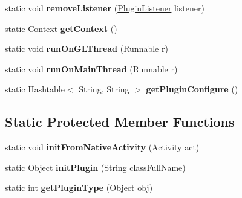 \begin{DoxyCompactItemize}
static void {\bfseries remove\+Listener} (\hyperlink{interfaceorg_1_1cocos2dx_1_1plugin_1_1PluginListener}{Plugin\+Listener} listener)
\item 
\mbox{\label{classorg_1_1cocos2dx_1_1plugin_1_1PluginWrapper_a78ef9321623e2262bfcdfec6293d1c01}} 
static Context {\bfseries get\+Context} ()
\item 
\mbox{\label{classorg_1_1cocos2dx_1_1plugin_1_1PluginWrapper_a8dac3d2958a16f7e74da27d0b2ef6ffe}} 
static void {\bfseries run\+On\+G\+L\+Thread} (Runnable r)
\item 
\mbox{\label{classorg_1_1cocos2dx_1_1plugin_1_1PluginWrapper_a62c74f83ce0165e66868e2ce2e6e91ea}} 
static void {\bfseries run\+On\+Main\+Thread} (Runnable r)
\item 
\mbox{\label{classorg_1_1cocos2dx_1_1plugin_1_1PluginWrapper_ae115f114c3d395cae05e2d59ad6678db}} 
static Hashtable$<$ String, String $>$ {\bfseries get\+Plugin\+Configure} ()
\end{DoxyCompactItemize}
\subsection*{Static Protected Member Functions}
\begin{DoxyCompactItemize}
\item 
\mbox{\label{classorg_1_1cocos2dx_1_1plugin_1_1PluginWrapper_aa4d50608581a82ca8aecf52bc017fac9}} 
static void {\bfseries init\+From\+Native\+Activity} (Activity act)
\item 
\mbox{\label{classorg_1_1cocos2dx_1_1plugin_1_1PluginWrapper_abc8220b4309f353f3d802c15e5aa2315}} 
static Object {\bfseries init\+Plugin} (String class\+Full\+Name)
\item 
\mbox{\label{classorg_1_1cocos2dx_1_1plugin_1_1PluginWrapper_aba97d0af426991bc61602745422acf45}} 
static int {\bfseries get\+Plugin\+Type} (Object obj)
\end{DoxyCompactItemize}
